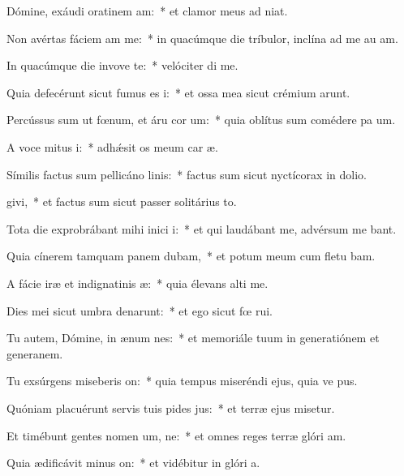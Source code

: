 \item Dómine, exáudi oratinem am:~* et clamor meus ad  niat.
\item Non avértas fáciem am  me:~* in quacúmque die tríbulor, inclína ad me au am.
\item In quacúmque die invove te:~* velóciter di me.
\item Quia defecérunt sicut fumus es i:~* et ossa mea sicut crémium arunt.
\item Percússus sum ut fœnum, et áru cor um:~* quia oblítus sum comédere pa um.
\item A voce mitus i:~* adhǽsit os meum car æ.
\item Símilis factus sum pellicáno linis:~* factus sum sicut nyctícorax in dolio.
\item {}givi,~* et factus sum sicut passer solitárius  to.
\item Tota die exprobrábant mihi inici i:~* et qui laudábant me, advérsum me bant.
\item Quia cínerem tamquam panem dubam,~* et potum meum cum fletu bam.
\item A fácie iræ et indignatinis æ:~* quia élevans alti me.
\item Dies mei sicut umbra denarunt:~* et ego sicut fœ rui.
\item Tu autem, Dómine, in ænum nes:~* et memoriále tuum in generatiónem et generanem.
\item Tu exsúrgens miseberis on:~* quia tempus miseréndi ejus, quia ve pus.
\item Quóniam placuérunt servis tuis pides jus:~* et terræ ejus misetur.
\item Et timébunt gentes nomen um, ne:~* et omnes reges terræ glóri am.
\item Quia ædificávit minus on:~* et vidébitur in glóri a.
